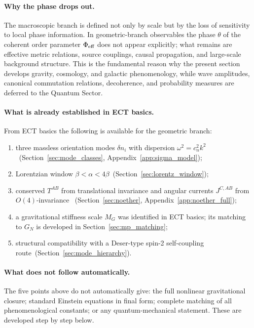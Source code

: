 \paragraph{Why the phase drops out.}
The macroscopic branch is defined not only by scale but by
the loss of sensitivity to local phase information.
In geometric-branch observables the phase $\theta$ of the
coherent order parameter $\Phi_{\rm eff}$ does not appear
explicitly; what remains are effective metric relations,
source couplings, causal propagation, and large-scale
background structure.
This is the fundamental reason why the present section develops
gravity, cosmology, and galactic phenomenology, while wave
amplitudes, canonical commutation relations, decoherence, and
probability measures are deferred to the Quantum Sector.

\paragraph{What is already established in ECT basics.}
From ECT basics the following is available for the geometric branch:
\begin{enumerate}[label=(\roman*)]
  \item three massless orientation modes $\delta n_i$ with dispersion
    $\omega^2=c_n^2 k^2$~(Section~\ref{sec:mode_classes},
    Appendix~\ref{app:sigma_model});
  \item Lorentzian window $\beta<\alpha<4\beta$~(Section~\ref{sec:lorentz_window});
  \item conserved $T^{AB}$ from translational invariance
    and angular currents $J^{C,AB}$ from $O(4)$-invariance
    ~(Section~\ref{sec:noether}, Appendix~\ref{app:noether_full});
  \item a gravitational stiffness scale $M_G$ was identified in ECT
    basics; its matching to $G_N$ is developed in Section~\ref{sec:mp_matching};
  \item structural compatibility with a Deser-type spin-2
    self-coupling route~(Section~\ref{sec:mode_hierarchy}).
\end{enumerate}

\paragraph{What does not follow automatically.}
The five points above do not automatically give:
the full nonlinear gravitational closure;
standard Einstein equations in final form;
complete matching of all phenomenological constants;
or any quantum-mechanical statement.
These are developed step by step below.


